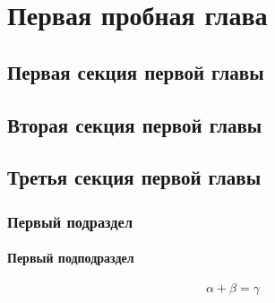 \chapter{Первая пробная глава}

\section{Первая секция первой главы}

\section{Вторая секция первой главы}

\section{Третья секция первой главы}

\subsection{Первый подраздел}

\subsubsection{Первый подподраздел}

\[
	\alpha + \beta = \gamma
\]

